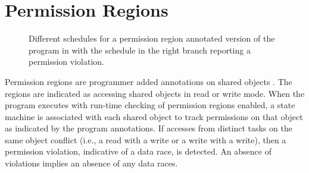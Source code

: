 \section{Permission Regions}

\begin{figure}[t]
  \centering
  \caption{Different schedules for a permission region annotated
    version of the program in  with the
    schedule in the right branch reporting a permission violation.}
  \label{fig:permission-violation-state}
\end{figure}

Permission regions are programmer added annotations on shared objects
\cite{Westbrook:2011:PRR:2341616.2341627,Westbrook:2012:PPR:2367163.2367201}. The regions are indicated
as accessing shared objects in read or write mode. When the program
executes with run-time checking of permission regions enabled, a state machine is associated with each shared object to track
permissions on that object as indicated by the program annotations. If
accesses from distinct tasks on the same object conflict (i.e., a read
with a write or a write with a write), then a permission violation, indicative of a data race, is detected. An absence of violations implies an absence of any data races. 

